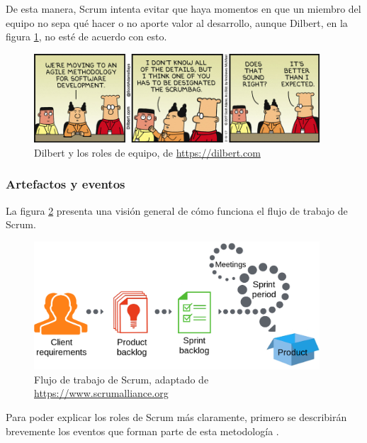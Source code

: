 De esta manera, Scrum intenta evitar que haya momentos en que un miembro del equipo no sepa qué hacer o no aporte valor al desarrollo, aunque Dilbert, en la figura \ref{fig:dilbert}, no esté de acuerdo con esto.

\begin{figure}[!h]
\begin{center}
\includegraphics[width=0.95\textwidth]{imagenes/5/dilbert.jpg}
\caption{Dilbert y los roles de equipo, de \url{https://dilbert.com}}
\label{fig:dilbert}
\end{center}
\end{figure}

\subsubsection{Artefactos y eventos}

La figura \ref{fig:scrum} presenta una visión general de cómo funciona el flujo de trabajo de Scrum.

\begin{figure}[!h]
\begin{center}
\includegraphics[width=0.95\textwidth]{imagenes/5/scrum.png}
\caption{Flujo de trabajo de Scrum, adaptado de \url{https://www.scrumalliance.org}}
\label{fig:scrum}
\end{center}
\end{figure}

Para poder explicar los roles de Scrum más claramente, primero se describirán brevemente los eventos que forman parte de esta metodología \cite{scrum-guide}.

